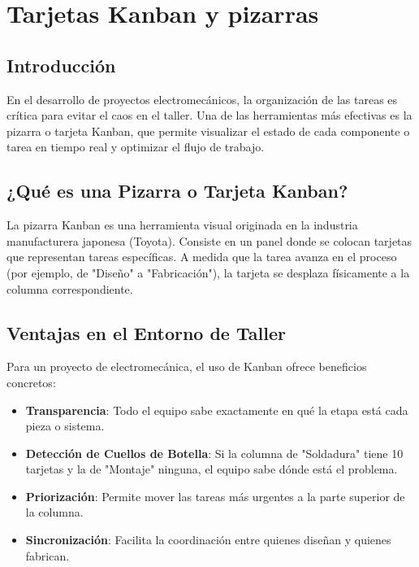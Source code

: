 \documentclass[../main]{subfiles}
\begin{document}
\chapter{Tarjetas Kanban y pizarras}


\section{Introducción}

En el desarrollo de proyectos electromecánicos, la organización de las tareas es crítica para evitar el caos en el taller. Una de las herramientas más efectivas es la pizarra o tarjeta Kanban, que permite visualizar el estado de cada componente o tarea en tiempo real y optimizar el flujo de trabajo.

\section{¿Qué es una Pizarra o Tarjeta Kanban?}

La pizarra Kanban es una herramienta visual originada en la industria manufacturera japonesa (Toyota). Consiste en un panel donde se colocan tarjetas que representan tareas específicas. A medida que la tarea avanza en el proceso (por ejemplo, de "Diseño" a "Fabricación"), la tarjeta se desplaza físicamente a la columna correspondiente.

\section{Ventajas en el Entorno de Taller}

Para un proyecto de electromecánica, el uso de Kanban ofrece beneficios concretos:

\begin{itemize}
    \item \textbf{Transparencia}: Todo el equipo sabe exactamente en qué la etapa está cada pieza o sistema.
    \item \textbf{Detección de Cuellos de Botella}: Si la columna de "Soldadura" tiene 10 tarjetas y la de "Montaje" ninguna, el equipo sabe dónde está el problema.
    \item \textbf{Priorización}: Permite mover las tareas más urgentes a la parte superior de la columna.
    \item \textbf{Sincronización}: Facilita la coordinación entre quienes diseñan y quienes fabrican.
\end{itemize}
\end{document}
